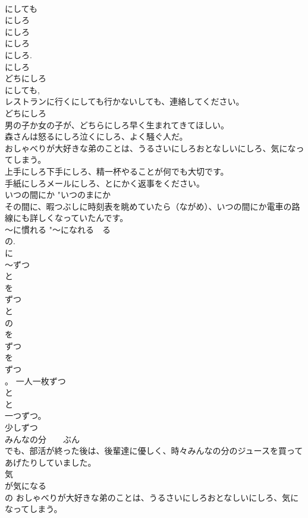 \documentclass[8pt]{extreport}
\begin{document}
\begin{CJK}{UTF8}{min}
\\	にしても 
\\	にしろ
\\	にしろ 
\\	にしろ
\\	にしろ. 
\\	にしろ 
\\	どちにしろ 
\\	にしても, 
\\	レストランに行くにしても行かないしても、連絡してください。 
\\	どちにしろ 
\\	男の子か女の子が、どちらにしろ早く生まれてきてほしい。 
\\	森さんは怒るにしろ泣くにしろ、よく騒ぐ人だ。 
\\	おしゃべりが大好きな弟のことは、うるさいにしろおとなしいにしろ、気になってしまう。 
\\	上手にしろ下手にしろ、精一杯やることが何でも大切です。 
\\	手紙にしろメールにしろ、とにかく返事をください。 
\\	いつの間にか	"いつのまにか 
\\	その間に、暇つぶしに時刻表を眺めていたら（ながめ）、いつの間にか電車の路線にも詳しくなっていたんです。
\\	～に慣れる	"～になれる　る
\\	の. 
\\	に 
\\	～ずつ	
\\	と
\\	を
\\	ずつ
\\	と
\\	の
\\	を
\\	ずつ
\\	を
\\	ずつ
\\	。 一人一枚ずつ
\\	と
\\	と
\\	一つずつ。　　
\\	少しずつ　　
\\	みんなの分　　ぶん 
\\	でも、部活が終った後は、後輩達に優しく、時々みんなの分のジュースを買ってあげたりしていました。 
\\	気	
\\	が気になる 
\\	の おしゃべりが大好きな弟のことは、うるさいにしろおとなしいにしろ、気になってしまう。 

\end{CJK}
\end{document}
